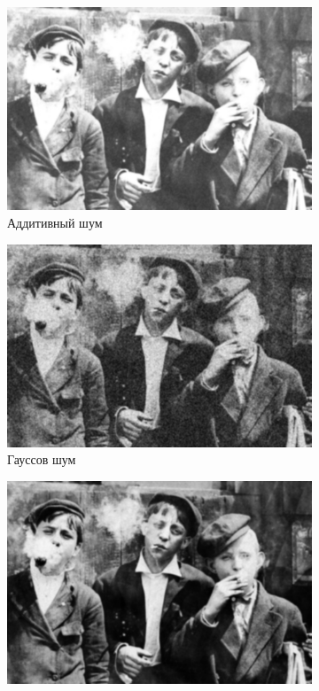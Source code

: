 \begin{figure}[ht!]
\begin{subfigure}[b]{0.5\linewidth}
      \includegraphics[width=0.95\linewidth]{../Gaussian_Blur/Gaussian_Blur_Additive_noise_(11,11).jpg} 
      \caption{Аддитивный шум} 
      \label{gaussian_11:c} 
      \vspace{4ex}
    \end{subfigure}%
    \begin{subfigure}[b]{0.5\linewidth}
      \centering
      \includegraphics[width=0.95\linewidth]{../Gaussian_Blur/Gaussian_Blur_Gaussian_noise_(11,11).jpg} 
      \caption{Гауссов шум} 
      \label{gaussian_11:d} 
      \vspace{4ex}
    \end{subfigure}
    \begin{subfigure}[b]{0.5\linewidth}
      \centering
      \includegraphics[width=0.95\linewidth]{../Gaussian_Blur/Gaussian_Blur_Poisson_noise_(11,11).jpg} 

\end{subfigure}
\end{figure}
